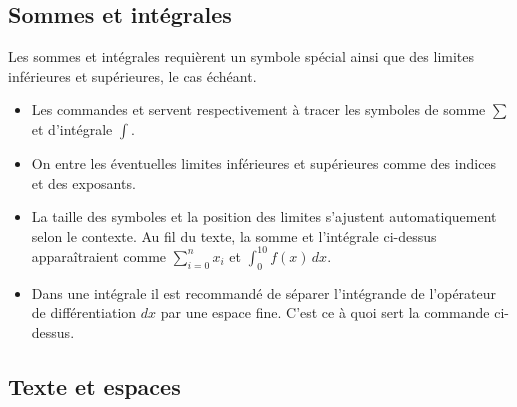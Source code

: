 \subsection{Sommes et intégrales}
\label{sec:math:bases:sommes-et-integrales}

Les sommes et intégrales requièrent un symbole spécial ainsi que des
limites inférieures et supérieures, le cas échéant.
\begin{itemize}
\item Les commandes \cmd{\sum} et \cmd{\int} servent respectivement à tracer les
  symboles de somme $\sum$ et d'intégrale $\int$.
\item On entre les éventuelles limites inférieures et supérieures
  comme des indices et des exposants.
\item La taille des symboles et la position des limites s'ajustent
  automatiquement selon le contexte. Au fil du texte, la somme et
  l'intégrale ci-dessus apparaîtraient comme $\sum_{i = 0}^n x_i$ et
  $\int_0^{10} f(x)\, dx$.
\item Dans une intégrale il est recommandé de séparer l'intégrande de
  l'opérateur de différentiation $dx$ par une espace fine. C'est ce à
  quoi sert la commande \cmd{\,} ci-dessus.
\end{itemize}


\subsection{Texte et espaces}
\label{sec:math:bases:texte}



